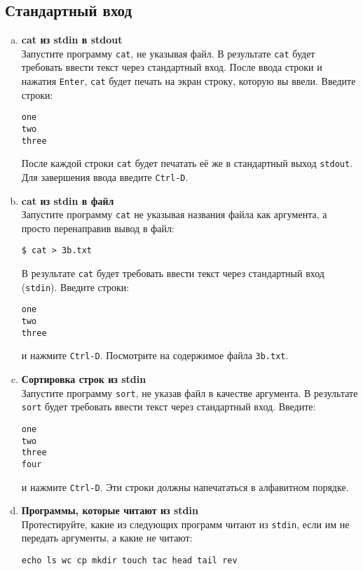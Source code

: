 \documentclass{article}
\begin{document}
\subsection{Стандартный вход}
\begin{enumerate}[a.]
\item \textbf{cat из stdin в stdout}\\
Запустите программу \texttt{cat}, не указывая файл. В результате \texttt{cat} будет требовать ввести текст через стандартный вход. После ввода строки и нажатия \texttt{Enter}, \texttt{cat} будет печать на экран строку, которую вы ввели. Введите строки:
\begin{lstlisting}
one
two
three
\end{lstlisting}
После каждой строки \texttt{cat} будет печатать её же в стандартный выход \texttt{stdout}. Для завершения ввода введите \texttt{Ctrl-D}.

\item \textbf{cat из stdin в файл}\\
Запустите программу \texttt{cat} не указывая названия файла как аргумента, а просто перенаправив вывод в файл:
\begin{lstlisting}
$ cat > 3b.txt
\end{lstlisting}
В результате \texttt{cat} будет требовать ввести текст через стандартный вход (\texttt{stdin}). Введите строки:
\begin{lstlisting}
one
two
three
\end{lstlisting}
и нажмите \texttt{Ctrl-D}. Посмотрите на содержимое файла \texttt{3b.txt}.

\item \textbf{Сортировка строк из stdin}\\
Запустите программу \texttt{sort}, не указав файл в качестве аргумента. В результате \texttt{sort} будет требовать ввести текст через стандартный вход. Введите:
\begin{lstlisting}
one
two
three
four
\end{lstlisting}
и нажмите \texttt{Ctrl-D}. Эти строки должны напечататься в алфавитном порядке.

\item \textbf{Программы, которые читают из stdin}\\
Протестируйте, какие из следующих программ читают из \texttt{stdin}, если им не передать аргументы, а какие не читают:
\begin{lstlisting}
echo ls wc cp mkdir touch tac head tail rev
\end{lstlisting}


\end{enumerate}
\end{document}
